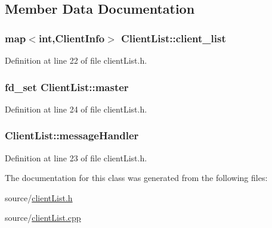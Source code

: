 \subsection{Member Data Documentation}
\subsubsection[{\texorpdfstring{client\+\_\+list}{client_list}}]{\setlength{\rightskip}{0pt plus 5cm}map$<$int,{\bf Client\+Info}$>$ Client\+List\+::client\+\_\+list\hspace{0.3cm}{\ttfamily [private]}}\hypertarget{class_client_list_a53c73362bff032aa6fceab4b8b5b39de}{}\label{class_client_list_a53c73362bff032aa6fceab4b8b5b39de}


Definition at line 22 of file client\+List.\+h.

\subsubsection[{\texorpdfstring{master}{master}}]{\setlength{\rightskip}{0pt plus 5cm}fd\+\_\+set Client\+List\+::master\hspace{0.3cm}{\ttfamily [private]}}\hypertarget{class_client_list_a819f5455b1afa484d846d5b6ef4209a7}{}\label{class_client_list_a819f5455b1afa484d846d5b6ef4209a7}


Definition at line 24 of file client\+List.\+h.

\subsubsection[{\texorpdfstring{message\+Handler}{messageHandler}}]{ Client\+List\+::message\+Handler\hspace{0.3cm}{\ttfamily [private]}}\hypertarget{class_client_list_a15fd10297f79e0d1278d3b106c715390}{}\label{class_client_list_a15fd10297f79e0d1278d3b106c715390}


Definition at line 23 of file client\+List.\+h.



The documentation for this class was generated from the following files\+:\begin{DoxyCompactItemize}
\item 
source/\hyperlink{client_list_8h}{client\+List.\+h}\item 
source/\hyperlink{client_list_8cpp}{client\+List.\+cpp}\end{DoxyCompactItemize}
